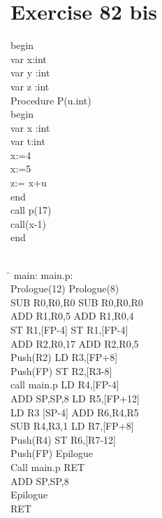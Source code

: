 \documentclass[10pt,a4paper]{article}
\begin{document}
\section{Exercise 82 bis}
begin\\
var x:int\\
var y :int\\
var z :int\\
Procedure P(u.int)\\
begin\\
var x :int\\
var t:int\\
x:=4\\
x:=5\\
z:= x+u\\
end\\
call p(17)\\
call(x-1)\\
end
\\
\\
\begin{tabbing}
\hspace{8cm}\=\kill
main:\> main.p:\\
Prologue(12) \> Prologue(8)\\
SUB R0,R0,R0 \> SUB R0,R0,R0\\
ADD R1,R0,5 \> ADD R1,R0,4\\
ST R1,[FP-4] \>   ST R1,[FP-4]\\
ADD R2,R0,17\>  ADD R2,R0,5\\
Push(R2)\> LD R3,[FP+8] \\
Push(FP) \> ST R2,[R3-8]\\
call main.p \> LD R4,[FP-4]\\
ADD SP,SP,8 \> LD R5,[FP+12]\\
LD R3 [SP-4]\> ADD R6,R4,R5\\
SUB R4,R3,1\> LD R7,[FP+8]\\
Push(R4)\> ST R6,[R7-12]\\
Push(FP)\> Epilogue\\
Call main.p\> RET\\
ADD SP,SP,8\>\\
Epilogue \> \\
RET \> \\

\end{tabbing}
\end{document}
